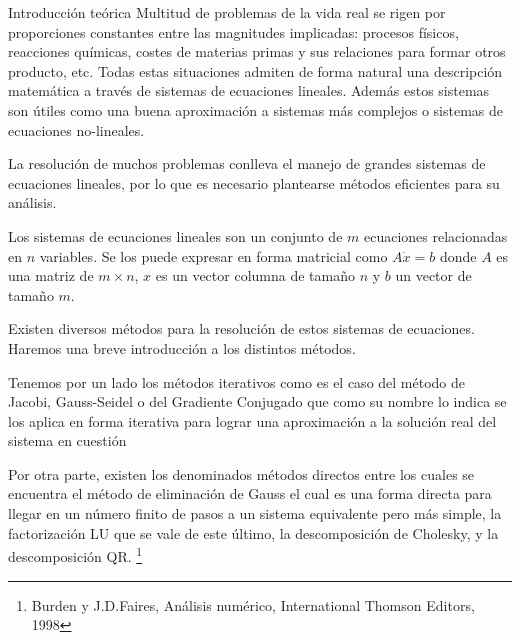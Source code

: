 \begin{section}{Introducción teórica}	
	Multitud de problemas de la vida real se rigen por proporciones constantes entre las magnitudes implicadas: procesos físicos, reacciones químicas, costes de materias primas y sus relaciones para formar otros producto, etc.
	Todas estas situaciones admiten de forma natural una descripción matemática a través de sistemas de ecuaciones lineales.
	Además estos sistemas son útiles como una buena aproximación a sistemas más complejos o sistemas de ecuaciones no-lineales.
	
	La resolución de muchos problemas conlleva el manejo de grandes sistemas de ecuaciones lineales, por lo que es necesario plantearse métodos eficientes para su análisis.
	
	Los sistemas de ecuaciones lineales son un conjunto de $m$ ecuaciones relacionadas en $n$ variables. Se los puede expresar en forma matricial como $A \dot x = b$ donde $A$ es una matriz de $m \times n$, $x$ es un vector columna de tamaño $n$ y $b$ un vector de tamaño $m$.
	
	Existen diversos métodos para la resolución de estos sistemas de ecuaciones. Haremos una breve introducción a los distintos métodos.
	
	Tenemos por un lado los métodos iterativos como es el caso del método de Jacobi, Gauss-Seidel o del Gradiente Conjugado que como su nombre lo indica se los aplica en forma iterativa para lograr una aproximación a la solución real del sistema en cuestión
	
	Por otra parte, existen los denominados métodos directos entre los cuales se encuentra el método de eliminación de Gauss el cual es una forma directa para llegar en un número finito de pasos a un sistema equivalente pero más simple, la factorización LU que se vale de este último, la descomposición de Cholesky, y la descomposición QR.	\footnote{Burden y J.D.Faires, Análisis numérico, International Thomson Editors, 1998}
\end{section}
